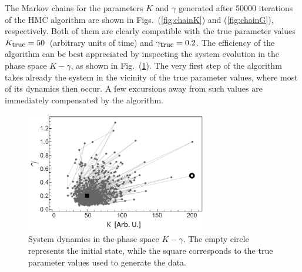 \documentclass[12pt,a4paper,final]{iopart}
\begin{document}
The Markov chains for the parameters $K$ and $\gamma$ generated after 50000 iterations of the HMC algorithm are shown in Figs.~(\ref{fig:chainK}) and (\ref{fig:chainG}), respectively. Both of them are clearly compatible with the true parameter values $K_{\mbox{\small true}} = 50$~(arbitrary units of time) and $\gamma_{\mbox{\small true}}=0.2$. 
The efficiency of the algorithm can be best appreciated by inspecting the system evolution in the phase space $K-\gamma$, as shown in Fig.~(\ref{fig:phase_space_evol}). The very first step of the algorithm takes already the system in the vicinity of the true parameter values, where most of its dynamics then occur. A few excursions away from such values are immediately compensated by the algorithm.
%
\begin{figure}[htb!]
    \centering
    \includegraphics[width=0.7\textwidth]{Figs/FigPhaseSpaceEvol.png}
    \caption{System dynamics in the phase space $K-\gamma$. The empty circle represents the initial state, while the square corresponds to the true parameter values used to generate the data.}
    \label{fig:phase_space_evol}
\end{figure}
\end{document}
